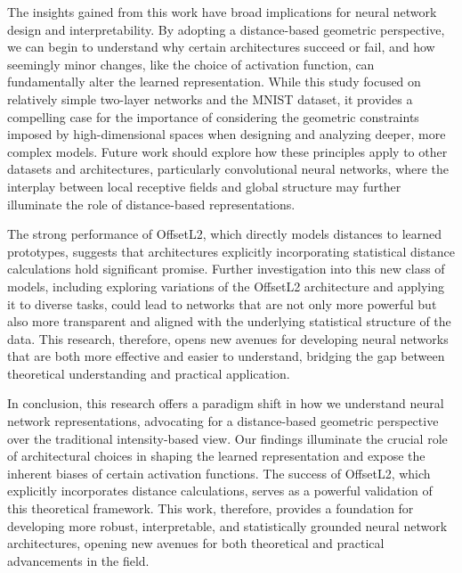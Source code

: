 The insights gained from this work have broad implications for neural network design and interpretability. By adopting a distance-based geometric perspective, we can begin to understand why certain architectures succeed or fail, and how seemingly minor changes, like the choice of activation function, can fundamentally alter the learned representation.  While this study focused on relatively simple two-layer networks and the MNIST dataset, it provides a compelling case for the importance of considering the geometric constraints imposed by high-dimensional spaces when designing and analyzing deeper, more complex models. Future work should explore how these principles apply to other datasets and architectures, particularly convolutional neural networks, where the interplay between local receptive fields and global structure may further illuminate the role of distance-based representations. 

The strong performance of OffsetL2, which directly models distances to learned prototypes, suggests that architectures explicitly incorporating statistical distance calculations hold significant promise. Further investigation into this new class of models, including exploring variations of the OffsetL2 architecture and applying it to diverse tasks, could lead to networks that are not only more powerful but also more transparent and aligned with the underlying statistical structure of the data. This research, therefore, opens new avenues for developing neural networks that are both more effective and easier to understand, bridging the gap between theoretical understanding and practical application.


In conclusion, this research offers a paradigm shift in how we understand neural network representations, advocating for a distance-based geometric perspective over the traditional intensity-based view. Our findings illuminate the crucial role of architectural choices in shaping the learned representation and expose the inherent biases of certain activation functions.  The success of OffsetL2, which explicitly incorporates distance calculations, serves as a powerful validation of this theoretical framework. This work, therefore, provides a foundation for developing more robust, interpretable, and statistically grounded neural network architectures, opening new avenues for both theoretical and practical advancements in the field.

